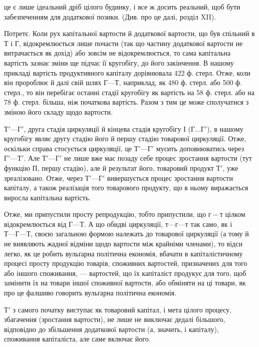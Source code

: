 \parcont{}  %
це є лише ідеальний дріб цілого будинку, і все ж досить реальний, щоб
бути забезпеченням для додаткової позики. (Див. про це далі, розділ XII).

Потретє. Коли рух капітальної вартости й додаткової вартости, що
був спільний в $Т$ і $Г$, відокремлюється лише почасти (так що частину
додаткової вартости не витрачається як дохід) або зовсім не відокремлюється,
то сама капітальна вартість зазнає зміни ще підчас її кругобігу,
до його закінчення. В нашому прикладі вартість продуктивного капіталу
дорівнювала 422 ф. стерл. Отже, коли він пророблює й далі свій шлях
$Г — Т$, наприклад, як 480 ф. стерл. або 500 ф. стерл., то він перебігає
останні стадії кругобігу як вартість на 58 ф. стерл. або на 78 ф. стерл.
більша, ніж початкова вартість. Разом з тим це може сполучатися з зміною
його складу щодо вартости.

$Т' — Г'$, друга стадія циркуляції й кінцева стадія кругобігу І ($ Г\dots{} Г'$),
в нашому кругобігу являє другу стадію його й першу стадію товарової
циркуляції. Отже, оскільки справа стосується циркуляції, це $Т' — Г'$ мусить
доповнюватись через $Г' — Т'$. Але $Т' — Г'$ не лише вже має позаду себе процес
зростання вартости (тут функцію $П$, першу стадію), але й результат його,
товаровий продукт $Т'$, уже зреалізовано. Отже, через $Т' — Г'$ вивершується
процес зростання вартости капіталу, а також реалізація того товарового продукту,
що в ньому виражається виросла капітальна вартість.

Отже, ми припустили просту репродукцію, тобто припустили, що
$г-т$ цілком відокремлюється від $Г — Т$. А що обидві циркуляції,
$т — г — т$ так само, як і $Т — Г — Т$, своєю загальною формою належать
до товарової циркуляції (а тому й не виявляють жадної відміни щодо
вартости між крайніми членами), то відси легко, як це робить вульґарна
політична економія, вбачати в капіталістичному процесі просту
продукцію товарів, споживних вартостей, призначених для того або іншого
споживання, — вартостей, що їх капіталіст продукує для того, щоб замінити
їх на товари іншої споживної вартости, або обміняти на ці товари, як
про це фалшиво говорить вульґарна політична економія.

$Т'$ з самого початку виступає як товаровий капітал, і мета цілого
процесу, збагачення (зростання вартости), не лише не виключає дедалі
більшого, відповідно до збільшення додаткової вартости (а, значить, і
капіталу), споживання капіталіста, але саме включає його.

